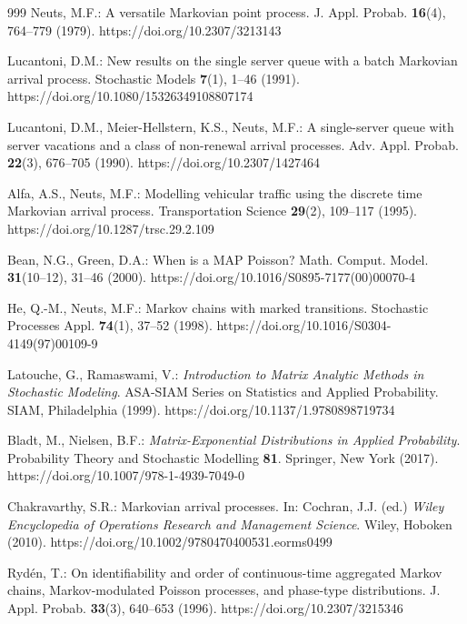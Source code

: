 \begin{thebibliography}{999}
Neuts, M.F.: A versatile Markovian point process. J. Appl. Probab. \textbf{16}(4), 764--779 (1979). https://doi.org/10.2307/3213143

Lucantoni, D.M.: New results on the single server queue with a batch Markovian arrival process. Stochastic Models \textbf{7}(1), 1--46 (1991). https://doi.org/10.1080/15326349108807174

Lucantoni, D.M., Meier-Hellstern, K.S., Neuts, M.F.: A single-server queue with
server vacations and a class of non-renewal arrival processes. Adv. Appl.
Probab. \textbf{22}(3), 676--705 (1990). https://doi.org/10.2307/1427464

Alfa, A.S., Neuts, M.F.: Modelling vehicular traffic using the discrete time Markovian arrival process. Transportation Science \textbf{29}(2), 109--117 (1995). https://doi.org/10.1287/trsc.29.2.109

Bean, N.G., Green, D.A.: When is a MAP Poisson? Math. Comput. Model.
\textbf{31}(10--12), 31--46 (2000).
https://doi.org/10.1016/S0895-7177(00)00070-4

He, Q.-M., Neuts, M.F.: Markov chains with marked transitions. Stochastic
Processes Appl. \textbf{74}(1), 37--52 (1998).
https://doi.org/10.1016/S0304-4149(97)00109-9

Latouche, G., Ramaswami, V.: \emph{Introduction to Matrix Analytic Methods in
Stochastic Modeling}. ASA-SIAM Series on Statistics and Applied Probability.
SIAM, Philadelphia (1999). https://doi.org/10.1137/1.9780898719734

Bladt, M., Nielsen, B.F.: \emph{Matrix-Exponential Distributions in Applied
Probability}. Probability Theory and Stochastic Modelling \textbf{81}.
Springer, New York (2017). https://doi.org/10.1007/978-1-4939-7049-0

Chakravarthy, S.R.: Markovian arrival processes. In: Cochran, J.J. (ed.) \emph{Wiley Encyclopedia of Operations Research and Management Science}. Wiley, Hoboken (2010). https://doi.org/10.1002/9780470400531.eorms0499

Ryd\'en, T.: On identifiability and order of continuous-time aggregated Markov chains, Markov-modulated Poisson processes, and phase-type distributions. J. Appl. Probab. \textbf{33}(3), 640--653 (1996). https://doi.org/10.2307/3215346


\end{thebibliography}
